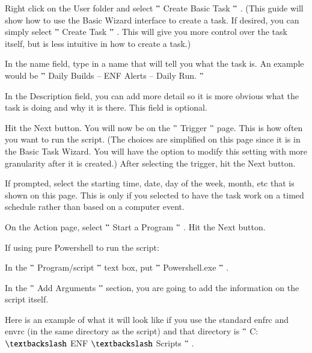 \documentclass[a4paper,12pt]{report}
\begin{document}
\begin{myEnumerate}
\item Right click on the User folder and select  $ " $ Create Basic Task $ " $ . (This guide will show how to use the Basic Wizard interface to create a task. If desired, you can simply select  $ " $ Create Task $ " $ . This will give you more control over the task itself, but is less intuitive in how to create a task.) \par
\item In the name field, type in a name that will tell you what the task is. An example would be  $ " $ Daily Builds – ENF Alerts – Daily Run. $ " $  \par
\item In the Description field, you can add more detail so it is more obvious what the task is doing and why it is there. This field is optional. \par
\item Hit the Next button. You will now be on the  $ " $ Trigger $ " $  page. This is how often you want to run the script. (The choices are simplified on this page since it is in the Basic Task Wizard. You will have the option to modify this setting with more granularity after it is created.) After selecting the trigger, hit the Next button. \par
\item If prompted, select the starting time, date, day of the week, month, etc that is shown on this page. This is only if you selected to have the task work on a timed schedule rather than based on a computer event. \par
\item On the Action page, select  $ " $ Start a Program $ " $ . Hit the Next button. \par
\item If using pure Powershell to run the script: \par
\begin{myEnumerate}
\item In the  $ " $ Program/script $ " $  text box, put  $ " $ Powershell.exe $ " $ . \par
\item In the  $ " $ Add Arguments $ " $  section, you are going to add the information on the script itself. \par
\begin{myEnumerate}
\item Here is an example of what it will look like if you use the standard enfrc and envrc (in the same directory as the script) and that directory is  $ " $ C: $  \textbackslash  $ ENF $  \textbackslash  $ Scripts $ " $ . \par
\end{myEnumerate}
\end{myEnumerate}
\end{myEnumerate}
\end{document}
